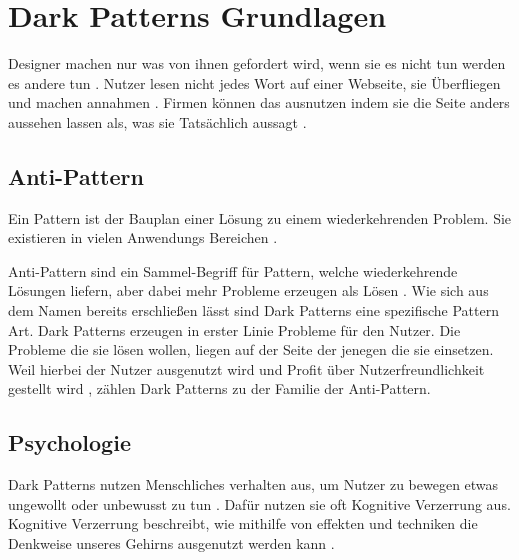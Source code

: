 \documentclass[conference,compsoc,final,a4paper]{IEEEtran}
\begin{document}
\newpage
\section{Dark Patterns Grundlagen}
Designer machen nur was von ihnen gefordert wird, wenn sie es nicht tun werden es andere tun \autocite{Nerdwriter1_YT_2018}. Nutzer lesen nicht jedes Wort auf einer Webseite, sie Überfliegen und machen annahmen \autocite{Brignull}. Firmen können das ausnutzen indem sie die Seite anders aussehen lassen als, was sie Tatsächlich aussagt \autocite{Brignull}.
\subsection{Anti-Pattern}
Ein Pattern ist der Bauplan einer Lösung zu einem wiederkehrenden Problem. Sie existieren in vielen Anwendungs Bereichen \autocite[S. 1]{MacDonald2019}.

Anti-Pattern sind ein Sammel-Begriff für Pattern, welche wiederkehrende Lösungen liefern, aber dabei mehr Probleme erzeugen als Lösen \autocite[S. 193-195]{MacDonald2019}. Wie sich aus dem Namen bereits erschließen lässt sind Dark Patterns eine spezifische Pattern Art. Dark Patterns erzeugen in erster Linie Probleme für den Nutzer. Die Probleme die sie lösen wollen, liegen auf der Seite der jenegen die sie einsetzen. Weil hierbei der Nutzer ausgenutzt wird und Profit über Nutzerfreundlichkeit gestellt wird \autocite{Chivukula_2019}, zählen Dark Patterns zu der Familie der Anti-Pattern.
\subsection{Psychologie}
\label{chap:Psychologie}
Dark Patterns nutzen Menschliches verhalten aus, um Nutzer zu bewegen etwas ungewollt oder unbewusst zu tun \autocite{Brignull}. Dafür nutzen sie oft Kognitive Verzerrung aus. Kognitive Verzerrung beschreibt, wie mithilfe von effekten und techniken die Denkweise unseres Gehirns ausgenutzt werden kann \autocite{Mathur2019}.
\end{document}
